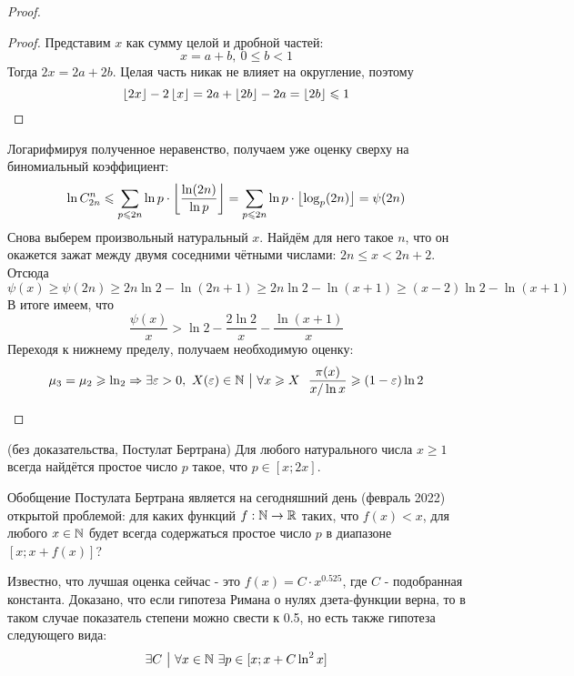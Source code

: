 \begin{proof}
\begin{itemize}
		\begin{proof}
			Представим $x$ как сумму целой и дробной частей:
			\[
				x = a + b,\ 0 \le b < 1
			\]
			Тогда $2x = 2a + 2b$. Целая часть никак не влияет на округление, поэтому
			\[
				\left\lfloor 2x \right\rfloor - 2\left\lfloor x \right\rfloor = 2a + \left\lfloor 2b \right\rfloor - 2a = \left\lfloor 2b \right\rfloor \leqslant 1
			\]
		\end{proof}
	
		Логарифмируя полученное неравенство, получаем уже оценку сверху на биномиальный коэффициент:
		\[
			\ln C_{2n}^n \leqslant \sum\limits_{p \leqslant 2n} \ln p \cdot \left\lfloor \frac{\ln (2n)}{\ln p} \right\rfloor = \sum\limits_{p \leqslant 2n} \ln p \cdot \left\lfloor \log_p (2n) \right\rfloor = \psi(2n)
		\]
		Снова выберем произвольный натуральный $x$. Найдём для него такое $n$, что он окажется зажат между двумя соседними чётными числами: $2n \le x < 2n + 2$. Отсюда
		\[
			\psi(x) \ge \psi(2n) \ge 2n\ln 2 - \ln (2n + 1) \ge 2n\ln 2 - \ln(x + 1) \ge (x - 2)\ln 2 - \ln (x + 1)
		\]
		В итоге имеем, что
		\[
			\frac{\psi(x)}{x} > \ln 2 - \frac{2\ln 2}{x} - \frac{\ln(x + 1)}{x}
		\]
		Переходя к нижнему пределу, получаем необходимую оценку:
		\[
			\mu_3 = \mu_2 \ge \ln_2 \Ra \exists \eps > 0,\ X(\eps) \in \N \such \forall x \ge X\ \ \frac{\pi(x)}{x / \ln x} \ge (1 - \eps)\ln 2
		\]
	\end{itemize}
\end{proof}

\begin{theorem} (без доказательства, Постулат Бертрана)
	Для любого натурального числа $x \ge 1$ всегда найдётся простое число $p$ такое, что $p \in [x; 2x]$.
\end{theorem}

\begin{note}
	Обобщение Постулата Бертрана является на сегодняшний день (февраль 2022) открытой проблемой: для каких функций $f: \mathbb{N} \to \mathbb{R}$ таких, что $f(x) < x$, для любого $x \in \mathbb{N}$ будет всегда содержаться простое число $p$ в диапазоне $[x; x + f(x)]$?
	
	Известно, что лучшая оценка сейчас - это $f(x) = C \cdot x^{0.525}$, где $C$ - подобранная константа. Доказано, что если гипотеза Римана о нулях дзета-функции верна, то в таком случае показатель степени можно свести к 0.5, но есть также гипотеза следующего вида:
	\[
		\exists C \ \big|\  \forall x \in \mathbb{N}\ \exists p \in [x; x + C\ln^2 x]
	\]
\end{note}